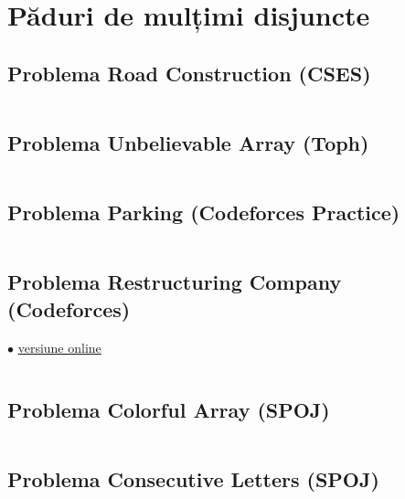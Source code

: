 \documentclass[../main.tex]{subfiles}
\begin{document}
\chapter{Păduri de mulțimi disjuncte}

\section{Problema Road Construction (CSES)}
\label{code:road-construction}

\inputminted{cpp}{../src/other-ds/road-construction.cpp}

\section{Problema Unbelievable Array (Toph)}
\label{code:unbelievable-array}

\inputminted{cpp}{../src/other-ds/unbelievable-array.cpp}

\section{Problema Parking (Codeforces Practice)}
\label{code:parking}

\inputminted{cpp}{../src/other-ds/parking.cpp}

\section{Problema Restructuring Company (Codeforces)}
\label{code:restructuring-company}
$\bullet$
\href{https://codeforces.com/contest/566/submission/304766362}{versiune online}

\inputminted{cpp}{../src/other-ds/restructuring-company.cpp}

\section{Problema Colorful Array (SPOJ)}
\label{code:colorful-array}

\inputminted{cpp}{../src/other-ds/colorful-array.cpp}

\section{Problema Consecutive Letters (SPOJ)}
\label{code:consecutive-letters}
\end{document}
